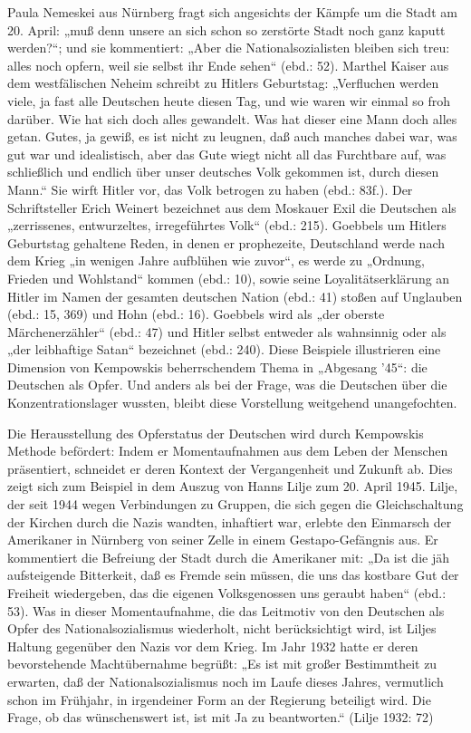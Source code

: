 \begin{multicols*}{2}
Paula Nemeskei aus Nürnberg fragt sich angesichts der Kämpfe um die Stadt am 20. April: „muß denn unsere an sich schon so zerstörte Stadt noch ganz kaputt werden?“; und sie kommentiert: „Aber die Nationalsozialisten bleiben sich treu: alles noch opfern, weil sie selbst ihr Ende sehen“ (ebd.: 52). Marthel Kaiser aus dem westfälischen Neheim schreibt zu Hitlers Geburtstag: „Verfluchen werden viele, ja fast alle Deutschen heute diesen Tag, und wie waren wir einmal so froh darüber. Wie hat sich doch alles gewandelt. Was hat dieser eine Mann doch alles getan. Gutes, ja gewiß, es ist nicht zu leugnen, daß auch manches dabei war, was gut war und idealistisch, aber das Gute wiegt nicht all das Furchtbare auf, was schließlich und endlich über unser deutsches Volk gekommen ist, durch diesen Mann.“ Sie wirft Hitler vor, das Volk betrogen zu haben (ebd.: 83f.). Der Schriftsteller Erich Weinert bezeichnet aus dem Moskauer Exil die Deutschen als „zerrissenes, entwurzeltes, irregeführtes Volk“ (ebd.: 215). Goebbels um Hitlers Geburtstag gehaltene Reden, in denen er prophezeite, Deutschland werde nach dem Krieg „in wenigen Jahre aufblühen wie zuvor“, es werde zu „Ordnung, Frieden und Wohlstand“ kommen (ebd.: 10), sowie seine Loyalitätserklärung an Hitler im Namen der gesamten deutschen Nation (ebd.: 41) stoßen auf Unglauben (ebd.: 15, 369) und Hohn (ebd.: 16). Goebbels wird als „der oberste Märchenerzähler“ (ebd.: 47) und Hitler selbst entweder als wahnsinnig oder als „der leibhaftige Satan“ bezeichnet (ebd.: 240). Diese Beispiele illustrieren eine Dimension von Kempowskis beherrschendem Thema in „Abgesang ’45“: die Deutschen als Opfer. Und anders als bei der Frage, was die Deutschen über die Konzentrationslager wussten, bleibt diese Vorstellung weitgehend unangefochten.

Die Herausstellung des Opferstatus der Deutschen wird durch Kempowskis Methode befördert: Indem er Momentaufnahmen aus dem Leben der Menschen präsentiert, schneidet er deren Kontext der Vergangenheit und Zukunft ab. Dies zeigt sich zum Beispiel in dem Auszug von Hanns Lilje zum 20. April 1945. Lilje, der seit 1944 wegen Verbindungen zu Gruppen, die sich gegen die Gleichschaltung der Kirchen durch die Nazis wandten, inhaftiert war, erlebte den Einmarsch der Amerikaner in Nürnberg von seiner Zelle in einem Gestapo-Gefängnis aus. Er kommentiert die Befreiung der Stadt durch die Amerikaner mit: „Da ist die jäh aufsteigende Bitterkeit, daß es Fremde sein müssen, die uns das kostbare Gut der Freiheit wiedergeben, das die eigenen Volksgenossen uns geraubt haben“ (ebd.: 53). Was in dieser Momentaufnahme, die das Leitmotiv von den Deutschen als Opfer des Nationalsozialismus wiederholt, nicht berücksichtigt wird, ist Liljes Haltung gegenüber den Nazis vor dem Krieg. Im Jahr 1932 hatte er deren bevorstehende Machtübernahme begrüßt: „Es ist mit großer Bestimmtheit zu erwarten, daß der Nationalsozialismus noch im Laufe dieses Jahres, vermutlich schon im Frühjahr, in irgendeiner Form an der Regierung beteiligt wird. Die Frage, ob das wünschenswert ist, ist mit Ja zu beantworten.“ (Lilje 1932: 72) 


\end{multicols*}
